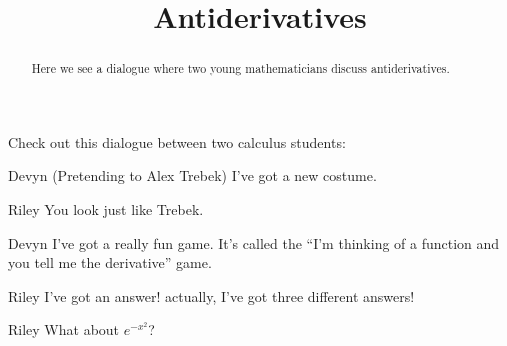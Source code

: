 \documentclass{ximera}
\title[Break-Ground:]{Antiderivatives}
\begin{document}
\begin{abstract}
Here we see a dialogue where two young mathematicians discuss antiderivatives.
\end{abstract}
\maketitle

Check out this dialogue between two calculus students:


\begin{dialogue}
\item[Devyn] (Pretending to Alex Trebek) I've got a new costume.
\item[Riley] You look just like Trebek.
\item[Devyn] I've got a really fun game.  It's called the ``I'm thinking of a function and you tell me the derivative'' game.
\item[Riley] I've got an answer!  actually, I've got three different answers!
\item[Riley] What about $e^{-x^2}$?
\end{dialogue}


\end{document}
